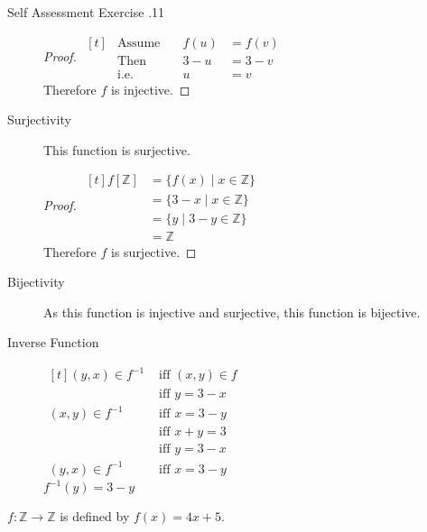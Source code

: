 \documentclass[\main/notes.tex]{subfiles}
\begin{document}
\begin{exercise}{Self Assessment Exercise \thechapter.11}
\begin{questions}
\begin{questions}
\begin{answer}
\begin{description}
											\begin{proof}
												$ 
													\begin{aligned}[t]
														& \text{Assume} \quad &f(u) &= f(v)\\
														& \text{Then} &3 - u &= 3 - v\\
														& \text{i.e.} & u &= v
													\end{aligned}
												$ \\
												Therefore $f$ is injective.
											\end{proof}
										\item[Surjectivity] This function is surjective.
											\begin{proof}
												$ 
													\begin{aligned}[t]
														f[\mathbb{Z}] &= \{f(x) \mid x \in \mathbb{Z}\}\\
														&= \{3 - x \mid x \in \mathbb{Z}\}\\
														&= \{y \mid 3 - y \in \mathbb{Z}\}\\
														&= \mathbb{Z}
													\end{aligned}
												$ \\
												Therefore $f$ is surjective.
											\end{proof}
										\item[Bijectivity] As this function is injective and surjective, this function is bijective.
										\item[Inverse Function] $ 
											\begin{aligned}[t]
												(y, x) \in f^{-1} &\text{ iff } (x, y) \in f\\
												& \text{ iff } y = 3 - x\\
												(x, y) \in f^{-1} & \text{ iff } x = 3 - y\\
												& \text{ iff } x + y = 3\\
												& \text{ iff } y = 3 - x\\
												(y, x) \in f^{-1} & \text{ iff } x = 3 - y
											\end{aligned}
										$ \\
										$f^{-1}(y) = 3 - y$
									\end{description}
								\end{answer}
							\item $f: \mathbb{Z} \rightarrow \mathbb{Z}$ is defined by $f(x) = 4x + 5$.
								\begin{answer}

\end{answer}
\end{questions}
\end{questions}
\end{exercise}
\end{document}
